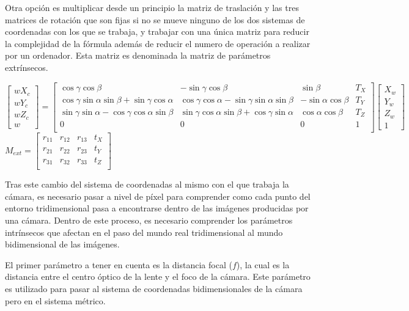 Otra opción es multiplicar desde un principio la matriz de traslación y las tres matrices de rotación que son fijas si no se mueve ninguno de los dos sistemas de coordenadas con los que se trabaja, y trabajar con una única matriz para reducir la complejidad de la fórmula además de reducir el numero de operación a realizar por un ordenador. Esta matriz es denominada la matriz de parámetros extrínsecos.

\begin{center}
$
\begin{bmatrix} wX_c \\ wY_c \\ wZ_c \\ w \end{bmatrix}
=
\begin{bmatrix}
\cos \gamma \cos \beta & - \sin \gamma \cos \beta & \sin \beta & T_X \\
\cos \gamma \sin \alpha \sin \beta + \sin \gamma \cos \alpha & \cos \gamma \cos \alpha - \sin \gamma \sin \alpha \sin \beta & - \sin \alpha \cos \beta & T_Y \\
\sin \gamma \sin \alpha - \cos \gamma \cos \alpha \sin \beta & \sin \gamma \cos \alpha \sin \beta + \cos \gamma \sin \alpha & \cos \alpha \cos \beta & T_Z \\
0 & 0 & 0 & 1 \\
\end{bmatrix}
\begin{bmatrix} X_w \\ Y_w \\ Z_w \\ 1 \end{bmatrix}
$
$
M_{ext}
=
\begin{bmatrix}
r_{11} & r_{12} & r_{13} & t_X \\
r_{21} & r_{22} & r_{23} & t_Y \\
r_{31} & r_{32} & r_{33} & t_Z \\
\end{bmatrix}
$
\end{center}

Tras este cambio del sistema de coordenadas al mismo con el que trabaja la cámara, es necesario pasar a nivel de píxel para comprender como cada punto del entorno tridimensional pasa a encontrarse dentro de las imágenes producidas por una cámara. Dentro de este proceso, es necesario comprender los parámetros intrínsecos que afectan en el paso del mundo real tridimensional al mundo bidimensional de las imágenes.

El primer parámetro a tener en cuenta es la distancia focal ($f$), la cual es la distancia entre el centro óptico de la lente y el foco de la cámara. Este parámetro es utilizado para pasar al sistema de coordenadas bidimensionales de la cámara pero en el sistema métrico.

